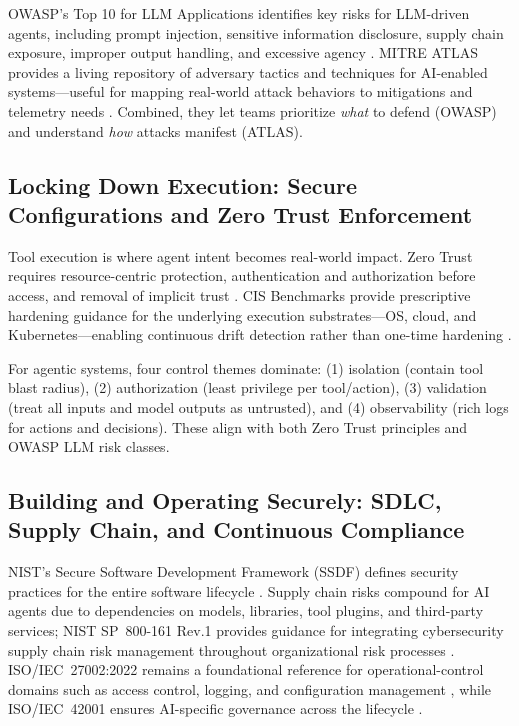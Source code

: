 \begin{TNtwocol}
      OWASP's Top 10 for LLM Applications identifies key risks for LLM-driven agents, including prompt injection, sensitive information disclosure, supply chain exposure, improper output handling, and excessive agency \cite{OWASP_LLM_Top10_PDF}. MITRE ATLAS provides a living repository of adversary tactics and techniques for AI-enabled systems—useful for mapping real-world attack behaviors to mitigations and telemetry needs \cite{MITRE_ATLAS}. Combined, they let teams prioritize \emph{what} to defend (OWASP) and understand \emph{how} attacks manifest (ATLAS).

      \subsection{Locking Down Execution: Secure Configurations and Zero Trust Enforcement}

      Tool execution is where agent intent becomes real-world impact. Zero Trust requires resource-centric protection, authentication and authorization before access, and removal of implicit trust \cite{NIST_SP800_207}. CIS Benchmarks provide prescriptive hardening guidance for the underlying execution substrates—OS, cloud, and Kubernetes—enabling continuous drift detection rather than one-time hardening \cite{CIS_Benchmarks}.

      For agentic systems, four control themes dominate: (1) isolation (contain tool blast radius), (2) authorization (least privilege per tool/action), (3) validation (treat all inputs and model outputs as untrusted), and (4) observability (rich logs for actions and decisions). These align with both Zero Trust principles and OWASP LLM risk classes.

      \subsection{Building and Operating Securely: SDLC, Supply Chain, and Continuous Compliance}

      NIST's Secure Software Development Framework (SSDF) defines security practices for the entire software lifecycle \cite{NIST_SP800_218}. Supply chain risks compound for AI agents due to dependencies on models, libraries, tool plugins, and third-party services; NIST SP~800-161 Rev.1 provides guidance for integrating cybersecurity supply chain risk management throughout organizational risk processes \cite{NIST_SP800_161R1}. ISO/IEC~27002:2022 remains a foundational reference for operational-control domains such as access control, logging, and configuration management \cite{ISO_27002_2022}, while ISO/IEC~42001 ensures AI-specific governance across the lifecycle \cite{ISO_42001_2023}.


\end{TNtwocol}
